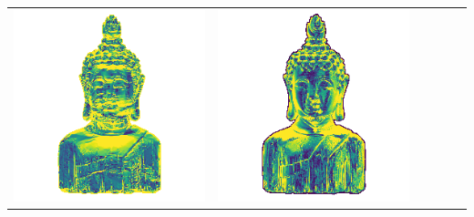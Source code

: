 \begin{center}
\begin{tabularx}{\linewidth}{@{}Y@{}Y@{}Y@{}Y@{}Y@{}Y@{}}
\includegraphics[width=\linewidth]{semisynthetic/20150514_16_yu_err.png} &
\includegraphics[width=\linewidth]{semisynthetic/20150514_16_dpsn_err.png} &

\end{tabularx}
\end{center}
